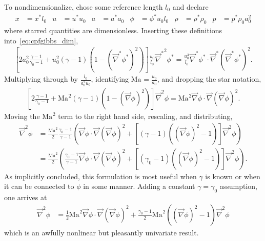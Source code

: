 \documentclass[letterpaper,11pt,nointlimits,reqno]{amsart}
\newcommand{\Mach}[1][]{\ensuremath{\mbox{Ma}_{#1}}}
\begin{document}
To nondimensionalize, chose some reference length $l_0$ and declare
\begin{align}
    x     &= x^\ast l_0
&   u     &= u^\ast u_0
&   a     &= a^\ast a_0
&   \phi  &= \phi^\ast u_0 l_0
&   \rho  &= \rho^\ast \rho_0
&   p     &= p^\ast \rho_0 a_0^2
\end{align}
where starred quantities are dimensionless.  Inserting these definitions
into~\eqref{eq:cpfgibbs_dim},
\begin{align}
    \left[
          2a_0^2 \frac{\gamma-1}{\gamma_0-1}
        + u_0^2 \left(\gamma-1\right)
          \left(1 - \left(\vec{\nabla}^\ast\phi^\ast\right)^2\right)
    \right] \frac{u_0}{l_0} {\vec{\nabla}^\ast}^2\phi^\ast
     =       \frac{u_0^3}{l_0} \vec{\nabla}^\ast\phi^\ast
       \cdot \vec{\nabla}^\ast\left(\vec{\nabla}^\ast\phi^\ast\right)^2
.
\end{align}
Multiplying through by $\frac{l_0}{a_0^2 u_0}$, identifying $\Mach =
\frac{u_0}{a_0}$, and dropping the star notation,
\begin{align}
    \left[
          2 \frac{\gamma-1}{\gamma_0-1}
        + \Mach^2 \left(\gamma-1\right)
          \left(1 - \left(\vec{\nabla}\phi\right)^2\right)
    \right] {\vec{\nabla}}^2\phi
     =       \Mach^2 \vec{\nabla}\phi
       \cdot \vec{\nabla}\left(\vec{\nabla}\phi\right)^2
.
\end{align}
Moving the $\Mach^2$ term to the right hand side, rescaling, and distributing,
\begin{align}
       {\vec{\nabla}}^2\phi
    &= \frac{\Mach^2}{2}\frac{\gamma_0-1}{\gamma-1} \left(
         \vec{\nabla}\phi \cdot \vec{\nabla}\left(\vec{\nabla}\phi\right)^2
       +
       \left[
             \left(\gamma-1\right)
             \left(\left(\vec{\nabla}\phi\right)^2 - 1\right)
       \right] {\vec{\nabla}}^2\phi
       \right)
\\  &= \frac{\Mach^2}{2} \left(
         \frac{\gamma_0-1}{\gamma-1}
         \vec{\nabla}\phi \cdot \vec{\nabla}\left(\vec{\nabla}\phi\right)^2
       +
       \left[
             \left(\gamma_0-1\right)
             \left(\left(\vec{\nabla}\phi\right)^2 - 1\right)
       \right] {\vec{\nabla}}^2\phi
       \right)
.
\end{align}
As \citeauthor{Saad2011Coordinate} implicitly concluded, this formulation is
most useful when $\gamma$ is known or when it can be connected to $\phi$ in
some manner.  Adding a constant $\gamma=\gamma_0$ assumption, one arrives at
\begin{align}
       {\vec{\nabla}}^2\phi
    &=   \frac{1}{2}\Mach^2
         \vec{\nabla}\phi \cdot \vec{\nabla}\left(\vec{\nabla}\phi\right)^2
       +
         \frac{\gamma_0-1}{2}\Mach^2
         \left(\left(\vec{\nabla}\phi\right)^2 - 1\right)
         {\vec{\nabla}}^2\phi
\label{eq:cpfgibbs_nondim}
\end{align}
which is an awfully nonlinear but pleasantly univariate result.
\end{document}
